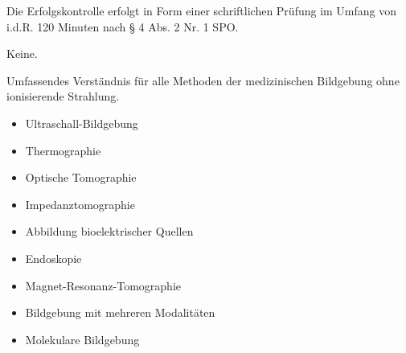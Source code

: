 \begin{course}

\setdoclanguagegerman
{}



\coursehead


\label{cour_8141.dp_997}


\begin{styleenv}
\begin{assessment}
Die Erfolgskontrolle erfolgt in Form einer schriftlichen Prüfung im Umfang von i.d.R. 120 Minuten nach § 4 Abs. 2 Nr. 1 SPO.


\end{assessment}

\begin{conditions}Keine.\end{conditions}


\end{styleenv}

\begin{learningoutcomes}
Umfassendes Verständnis für alle Methoden der medizinischen Bildgebung ohne ionisierende Strahlung.


\end{learningoutcomes}

\begin{content}
\begin{itemize}\item  Ultraschall-Bildgebung  \item  Thermographie  \item  Optische Tomographie  \item  Impedanztomographie  \item  Abbildung bioelektrischer Quellen  \item  Endoskopie  \item  Magnet-Resonanz-Tomographie  \item Bildgebung mit mehreren Modalitäten  \item  Molekulare Bildgebung  \end{itemize}
\end{content}







\end{course}